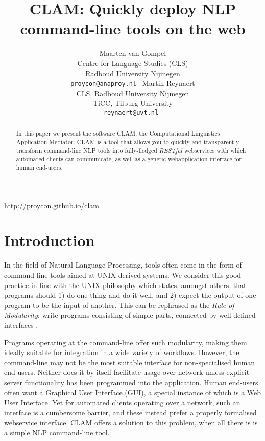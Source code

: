\documentclass[11pt]{article}
\title{CLAM: Quickly deploy NLP command-line tools on the web}
\author{Maarten van Gompel \\ 
  Centre for Language Studies (CLS) \\
  Radboud University Nijmegen \\
  {\tt proycon@anaproy.nl } \And 
  Martin Reynaert \\
  CLS, Radboud University Nijmegen \\
  TiCC, Tilburg University  \\
  {\tt reynaert@uvt.nl } 
  }
\begin{document}
\maketitle

\begin{center}
\url{http://proycon.github.io/clam}
\bigskip
\end{center}


\begin{abstract}
In this paper we present the software CLAM; the Computational Linguistics
Application Mediator. CLAM is a tool that allows you to quickly and
transparently transform command-line NLP tools into fully-fledged
\emph{RESTful}\/ webservices with which automated clients can communicate, as
well as a generic webapplication interface for human end-users.
\end{abstract}


\section{Introduction}



In the field of Natural Language Processing, tools often come in the
form of command-line tools aimed at UNIX-derived systems. We consider this good
practice in line with the UNIX philosophy \cite{unixphilo} which states,
amongst others, that programs should 1) do one thing and do it well, and 2) expect the output of one
program to be the input of another. This can be rephrased as the \emph{Rule of
Modularity}: write programs consisting of simple parts, connected by
well-defined interfaces \cite{RAYMOND2004}.

Programs operating at the command-line
offer such modularity, making them ideally suitable for integration in a
wide variety of workflows. However, the command-line may not be the most suitable interface for non-specialised
human end-users. Neither does it by itself facilitate usage over network unless
explicit server functionality has been programmed into the application.
Human end-users often want a Graphical User Interface (GUI), a special instance of which
is a Web User Interface. Yet for automated clients operating over a network, such an interface is a
cumbersome barrier, and these instead prefer a properly formalised webservice
interface. CLAM offers a solution to this problem, when all there is is a
simple NLP command-line tool.
\end{document}

